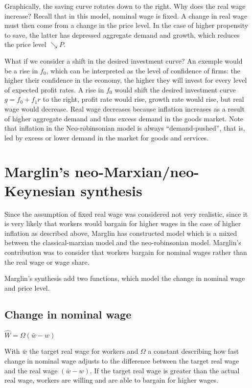 \documentclass[
  letterpaper,
  DIV=11,
  numbers=noendperiod]{scrreprt}
\begin{document}
Graphically, the saving curve rotates down to the right. Why does the
real wage increase? Recall that in this model, nominal wage is fixed. A
change in real wage must then come from a change in the price level. In
the case of higher propensity to save, the latter has depressed
aggregate demand and growth, which reduces the price level
\(\searrow P\).

What if we consider a shift in the desired investment curve? An exemple
would be a rise in \(f_0\), which can be interpreted as the level of
confidence of firms: the higher their confidence in the economy, the
higher they will invest for every level of expected profit rates. A rise
in \(f_0\) would shift the desired investment curve \(g = f_0+f_1r\) to
the right, profit rate would rise, growth rate would rise, but real wage
would decrease. Real wage decreases because inflation increases as a
result of higher aggregate demand and thus excess demand in the goods
market. Note that inflation in the Neo-robinsonian model is always
``demand-pushed'', that is, led by excess or lower demand in the market
for goods and services.

\hypertarget{marglins-neo-marxianneo-keynesian-synthesis}{%
\section{Marglin's neo-Marxian/neo-Keynesian
synthesis}\label{marglins-neo-marxianneo-keynesian-synthesis}}

Since the assumption of fixed real wage was considered not very
realistic, since it is very likely that workers would bargain for higher
wages in the case of higher inflation as described above, Marglin has
constructed model which is a mixed between the classical-marxian model
and the neo-robinsonian model. Marglin's contribution was to consider
that workers bargain for nominal wages rather than the real wage or wage
share.

Marglin's synthesis add two functions, which model the change in nominal
wage and price level.

\hypertarget{change-in-nominal-wage}{%
\subsection{Change in nominal wage}\label{change-in-nominal-wage}}

\(\hat{W} = \Omega (\bar{w} - w)\)

With \(\bar{w}\) the target real wage for workers and \(\Omega\) a
constant describing how fast change in nominal wage adjusts to the
difference between the target real wage and the real wage
\((\bar{w} - w)\). If the target real wage is greater than the actual
real wage, workers are willing and are able to bargain for higher wages.
\end{document}
